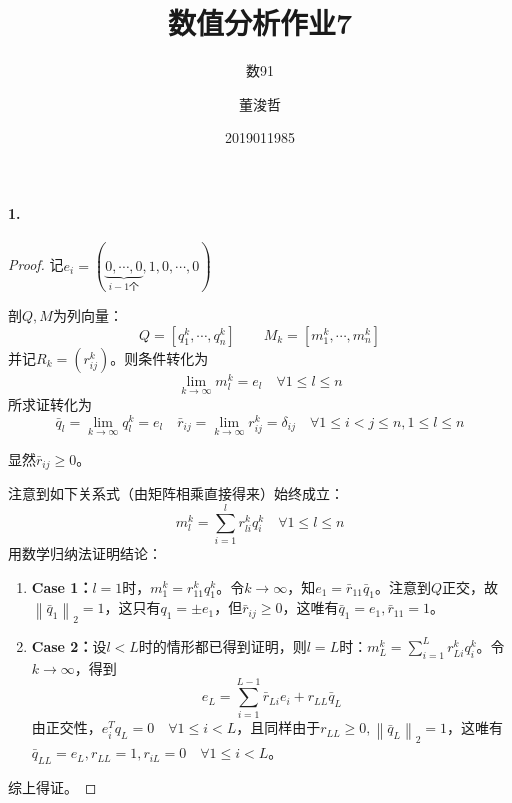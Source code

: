 \documentclass{ctexart}
\title{数值分析作业7}
\author{数91\and 董浚哲\and 2019011985}
\begin{document}
\maketitle
\newcommand{\R}{\mathbf{R}}
\newcommand{\dd}{\,\mathrm{d}}
\newcommand{\st}{\text{ s.t. }}
\newcommand{\pp}[2]{\frac{\partial #1}{\partial #2}}
\newcommand{\nm}[1]{\left\|#1\right\|}

\paragraph{1.}
\begin{proof}
记$e_i=(\underbrace{0,\cdots,0}_{i-1\text{个}},1,0,\cdots,0)$

剖$Q,M$为列向量：\[Q=[q^k_1,\cdots,q^k_n]\qquad M_k=[m^k_1,\cdots, m^k_n]\]并记$R_k=(r_{ij}^k)$。则条件转化为
\[\lim\limits_{k\to\infty}m^k_l=e_l\quad\forall 1\leq l\leq n\]
所求证转化为
\[\bar{q}_l=\lim\limits_{k\to\infty}q_l^k= e_l\quad\bar r_{ij}=\lim\limits_{k\to\infty}r^k_{ij}= \delta_{ij}\quad \forall 1\leq i<j\leq n,1\leq l\leq n\]

显然$\bar r_{ij}\geq 0$。

注意到如下关系式（由矩阵相乘直接得来）始终成立：
\[m^k_l=\sum_{i=1}^lr^k_{li}q^k_i\quad \forall 1\leq l\leq n\]
用数学归纳法证明结论：
\begin{enumerate}
\item \textbf{Case 1：}$l=1$时，$m_1^k=r_{11}^kq^k_1$。令$k\to\infty$，知$e_1=\bar r_{11}\bar q_1$。注意到$Q$正交，故$\nm{\bar q_1}_2=1$，这只有$q_1=\pm e_1$，但$\bar r_{ij}\geq 0$，这唯有$\bar q_1=e_1,\bar r_{11}=1$。

\item \textbf{Case 2：}设$l<L$时的情形都已得到证明，则$l=L$时：$m_L^k=\sum_{i=1}^Lr_{Li}^kq_i^k$。令$k\to\infty$，得到\[e_L=\sum_{i=1}^{L-1} \bar r_{Li}e_i+r_{LL}\bar q_L\]
由正交性，$e_i^Tq_L=0\quad\forall 1\leq i<L$，且同样由于$r_{LL}\geq 0,\nm{\bar q_L}_2=1$，这唯有$\bar q_{LL}=e_L,r_{LL}=1, r_{iL}=0\quad \forall 1\leq i<L$。
\end{enumerate}
综上得证。
\end{proof}
\end{document}
